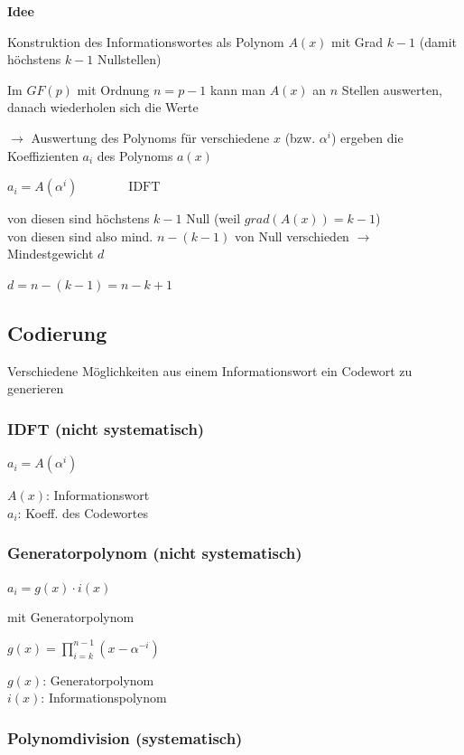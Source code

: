 \textbf{Idee}

Konstruktion des Informationswortes als Polynom $A(x)$ mit Grad $k-1$ (damit höchstens $k-1$ Nullstellen)

Im $GF(p)$ mit Ordnung $n = p-1$ kann man $A(x)$ an $n$ Stellen auswerten, danach wiederholen sich die Werte

$\rightarrow$ Auswertung des Polynoms für verschiedene $x$ (bzw. $\alpha^i$) ergeben die Koeffizienten $a_i$ des
Polynoms $a(x)$

$\displaystyle{
    a_i = A(\alpha^i) \qquad\qquad \text{IDFT}
}$

von diesen sind höchstens $k-1$ Null (weil $grad(A(x)) = k-1$)\\
von diesen sind also mind. $n - (k-1)$ von Null verschieden $\rightarrow$ Mindestgewicht $d$

$d = n - (k - 1) = n - k + 1$

\subsection{Codierung}

Verschiedene Möglichkeiten aus einem Informationswort ein Codewort zu generieren

\subsubsection{IDFT (nicht systematisch)}

$\displaystyle{
    a_i = A(\alpha^i)
}$

$A(x)$: Informationswort\\
$a_i$: Koeff. des Codewortes

\subsubsection{Generatorpolynom (nicht systematisch)}

$\displaystyle{
    a_i = g(x) \cdot i(x)
}$

mit Generatorpolynom

$g(x) = \prod_{i=k}^{n-1} (x - \alpha^{-i})$

$g(x)$: Generatorpolynom\\
$i(x)$: Informationspolynom

\subsubsection{Polynomdivision (systematisch)}

